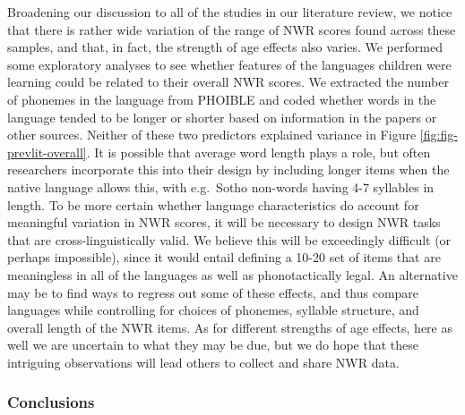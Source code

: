 \documentclass[english,,man,floatsintext]{apa6}
\begin{document}
Broadening our discussion to all of the studies in our literature review, we notice that there is rather wide variation of the range of NWR scores found across these samples, and that, in fact, the strength of age effects also varies. We performed some exploratory analyses to see whether features of the languages children were learning could be related to their overall NWR scores. We extracted the number of phonemes in the language from PHOIBLE and coded whether words in the language tended to be longer or shorter based on information in the papers or other sources. Neither of these two predictors explained variance in Figure \ref{fig:fig-prevlit-overall}. It is possible that average word length plays a role, but often researchers incorporate this into their design by including longer items when the native language allows this, with e.g.~Sotho non-words having 4-7 syllables in length. To be more certain whether language characteristics do account for meaningful variation in NWR scores, it will be necessary to design NWR tasks that are cross-linguistically valid. We believe this will be exceedingly difficult (or perhaps impossible), since it would entail defining a 10-20 set of items that are meaningless in all of the languages as well as phonotactically legal. An alternative may be to find ways to regress out some of these effects, and thus compare languages while controlling for choices of phonemes, syllable structure, and overall length of the NWR items. As for different strengths of age effects, here as well we are uncertain to what they may be due, but we do hope that these intriguing observations will lead others to collect and share NWR data.

\hypertarget{conclusions}{%
\subsubsection{Conclusions}\label{conclusions}}
\end{document}
